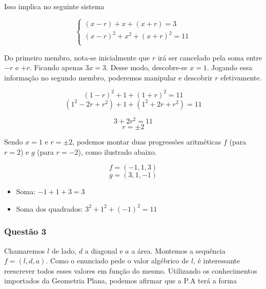\documentclass[11pt]{article}
\begin{document}
Isso implica no seguinte sistema

\begin{tcolorbox}[colback=LightYellow]
\begin{equation*}
\begin{cases}
  (x - r) + x + (x + r) = 3 \\
  (x - r)^2 + x^2 + (x + r)^2 = 11 \\
\end{cases}
\end{equation*}
\end{tcolorbox}

Do primeiro membro, nota-se inicialmente que $r$ irá ser cancelado pela soma entre $-r$ e $+r$. Ficando apenas $3x = 3$. Desse modo, descobre-se $x = 1$. Jogando essa informação no segundo membro, poderemos manipular e descobrir $r$ efetivamente.

\begin{tcolorbox}[colback=LightYellow]
\[(1 - r)^{2} + 1 + (1 + r)^{2} = 11\]
\[(1^{2} - 2r + r^{2}) + 1 + (1^{2} + 2r + r^{2}) = 11\]
\end{tcolorbox}

\begin{tcolorbox}[colback=LightYellow]
\[3 + 2r^{2} = 11 \]
\[r = \pm 2\]
\end{tcolorbox}

Sendo $x = 1$ e $r = \pm 2$, podemos montar duas progressões aritméticas $f$ (para $r = 2$) e $g$ (para $r = -2$), como ilustrado abaixo.


\begin{tcolorbox}[colback=LightYellow]
  \[f = (-1, 1, 3)\]
  \[g = (3, 1, -1)\]

  \begin{itemize}
          \item Soma: $-1 + 1 + 3 = 3$
          \item Soma dos quadrados: $3^{2} + 1^{2} + (-1)^{2} = 11$
  \end{itemize}
\end{tcolorbox}

\subsubsection{Questão 3}

Chamaremos $l$ de lado, $d$ a diagonal e $a$ a área. Montemos a sequência $f = (l, d, a)$. Como o enunciado pede o valor algébrico de $l$, é interessante reescrever todos esses valores em função do mesmo. Utilizando os conhecimentos importados da Geometria Plana, podemos afirmar que a P.A terá a forma
\end{document}
